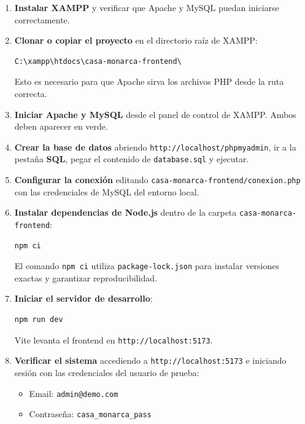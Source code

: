 \documentclass[10pt,letterpaper]{report}
\begin{document}
\begin{enumerate}[label=\arabic*.]
  \item \textbf{Instalar XAMPP} y verificar que Apache y MySQL puedan iniciarse correctamente.

  \item \textbf{Clonar o copiar el proyecto} en el directorio raíz de XAMPP:
  \begin{lstlisting}[style=bashstyle]
C:\xampp\htdocs\casa-monarca-frontend\
  \end{lstlisting}
  Esto es necesario para que Apache sirva los archivos PHP desde la ruta correcta.

  \item \textbf{Iniciar Apache y MySQL} desde el panel de control de XAMPP. Ambos deben aparecer en verde.

  \item \textbf{Crear la base de datos} abriendo \texttt{http://localhost/phpmyadmin}, ir a la pestaña \textbf{SQL}, pegar el contenido de \texttt{database.sql} y ejecutar.

  \item \textbf{Configurar la conexión} editando \texttt{casa-monarca-frontend/conexion.php} con las credenciales de MySQL del entorno local.

  \item \textbf{Instalar dependencias de Node.js} dentro de la carpeta \texttt{casa-monarca-frontend}:
  \begin{lstlisting}[style=bashstyle]
npm ci
  \end{lstlisting}
  El comando \texttt{npm ci} utiliza \texttt{package-lock.json} para instalar versiones exactas y garantizar reproducibilidad.

  \item \textbf{Iniciar el servidor de desarrollo}:
  \begin{lstlisting}[style=bashstyle]
npm run dev
  \end{lstlisting}
  Vite levanta el frontend en \texttt{http://localhost:5173}.

  \item \textbf{Verificar el sistema} accediendo a \texttt{http://localhost:5173} e iniciando sesión con las credenciales del usuario de prueba:
  \begin{itemize}
    \item Email: \texttt{admin@demo.com}
    \item Contraseña: \texttt{casa\_monarca\_pass}
  \end{itemize}
\end{enumerate}
\end{document}
